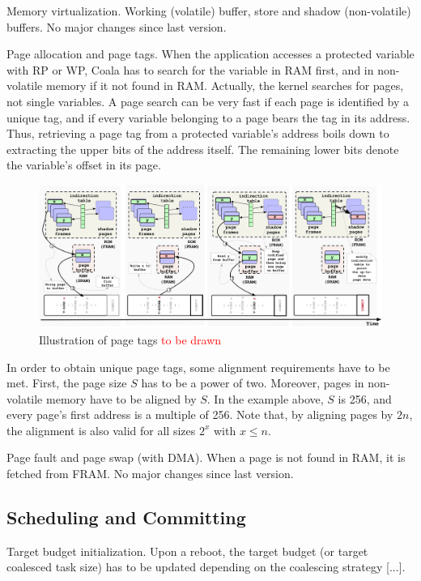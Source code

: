 Memory virtualization. Working (volatile) buffer, store and shadow (non-volatile) buffers. No major changes since last version.

Page allocation and page tags. When the application accesses a protected variable with RP or WP, Coala has to search for the variable in RAM first, and in non-volatile memory if it not found in RAM. Actually, the kernel searches for pages, not single variables. A page search can be very fast if each page is identified by a unique tag, and if every variable belonging to a page bears the tag in its address. Thus, retrieving a page tag from a protected variable’s address boils down to extracting the upper bits of the address itself. The remaining lower bits denote the variable’s offset in its page.

\begin{figure}
	\includegraphics[width=\textwidth]{figures/graffle/paging.pdf}
	\caption{Illustration of page tags \textcolor{red}{to be drawn}}
\end{figure}

In order to obtain unique page tags, some alignment requirements have to be met. First, the page size $S$ has to be a power of two. Moreover, pages in non-volatile memory have to be aligned by $S$. In the example above, $S$ is 256, and every page’s first address is a multiple of 256. Note that, by aligning pages by $2n$, the alignment is also valid for all sizes $2^x$ with $x \leq n$.

Page fault and page swap (with DMA). When a page is not found in RAM, it is fetched from FRAM. No major changes since last version.

\subsection{Scheduling and Committing}

Target budget initialization. Upon a reboot, the target budget (or target coalesced task size) has to be updated depending on the coalescing strategy [...].

